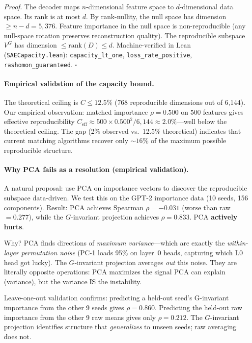 \documentclass{article}
\begin{document}
\noindent\textit{Proof.}
The decoder maps $n$-dimensional feature space to $d$-dimensional data space. Its rank is at most $d$. By rank-nullity, the null space has dimension $\geq n - d = 5{,}376$. Feature importance in the null space is non-reproducible (any null-space rotation preserves reconstruction quality). The reproducible subspace $V^G$ has dimension $\leq \text{rank}(D) \leq d$. Machine-verified in Lean (\texttt{SAECapacity.lean}): \texttt{capacity\_lt\_one}, \texttt{loss\_rate\_positive}, \texttt{rashomon\_guaranteed}. \hfill$\square$

\paragraph{Empirical validation of the capacity bound.}
The theoretical ceiling is $C \leq 12.5\%$ (768 reproducible dimensions out of 6{,}144). Our empirical observation: matched importance $\rho = 0.500$ on 500 features gives effective reproducibility $C_{\text{eff}} \approx 500 \times 0.500^2 / 6{,}144 \approx 2.0\%$---well below the theoretical ceiling. The gap (2\% observed vs.\ 12.5\% theoretical) indicates that current matching algorithms recover only ${\sim}16\%$ of the maximum possible reproducible structure.

\paragraph{Why PCA fails as a resolution (empirical validation).}
A natural proposal: use PCA on importance vectors to discover the reproducible subspace data-driven. We test this on the GPT-2 importance data (10 seeds, 156 components). Result: PCA achieves Spearman $\rho = -0.031$ (worse than raw $= 0.277$), while the $G$-invariant projection achieves $\rho = 0.833$. PCA \textbf{actively hurts}.

Why? PCA finds directions of \emph{maximum variance}---which are exactly the \emph{within-layer permutation noise} (PC-1 loads 95\% on layer~0 heads, capturing which L0 head got lucky). The $G$-invariant projection averages \emph{out} this noise. They are literally opposite operations: PCA maximizes the signal PCA can explain (variance), but the variance IS the instability.

Leave-one-out validation confirms: predicting a held-out seed's G-invariant importance from the other 9 seeds gives $\rho = 0.860$. Predicting the held-out raw importance from the other 9 raw means gives only $\rho = 0.212$. The $G$-invariant projection identifies structure that \emph{generalizes} to unseen seeds; raw averaging does not.
\end{document}
